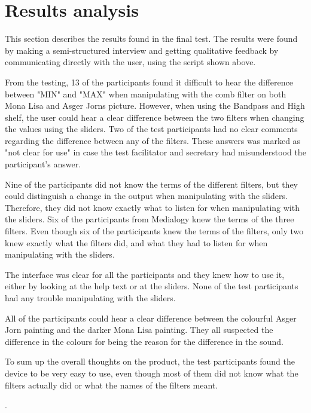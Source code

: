 \section{Results analysis}
This section describes the results found in the final test. The results were found by making a semi-structured interview and getting qualitative feedback by communicating directly with the user, using the script shown above. 

From the testing, 13 of the participants found it difficult to hear the difference between "MIN" and "MAX" when manipulating with the comb filter on both Mona Lisa and Asger Jorns picture. However, when using the Bandpass and High shelf, the user could hear a clear difference between the two filters when changing the values using the sliders. Two of the test participants had no clear comments regarding the difference between any of the filters. These answers was marked as "not clear for use" in case the test facilitator and secretary had misunderstood the participant's answer. 

Nine of the participants did not know the terms of the different filters, but they could distinguish a change in the output when manipulating with the sliders. Therefore, they did not know exactly what to listen for when manipulating with the sliders. Six of the participants from Medialogy knew the terms of the three filters. Even though six of the participants knew the terms of the filters, only two knew exactly what the filters did, and what they had to listen for when manipulating with the sliders. 

The interface was clear for all the participants and they knew how to use it, either by looking at the help text or at the sliders. None of the test participants had any trouble manipulating with the sliders. 

All of the participants could hear a clear difference between the colourful Asger Jorn painting and the darker Mona Lisa painting. They all suspected the difference in the colours for being the reason for the difference in the sound. 

To sum up the overall thoughts on the product, the test participants found the device to be very easy to use, even though most of them did not know what the filters actually did or what the names of the filters meant. 

. 